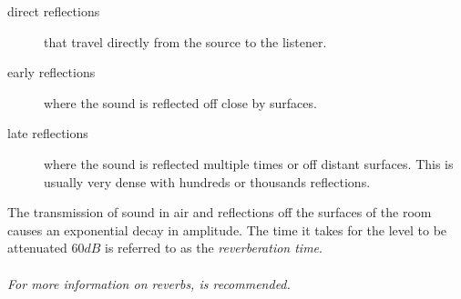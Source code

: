 \begin{description}
    \item[direct reflections] that travel directly from the source to the listener.
    \item[early reflections] where the sound is reflected off close by surfaces.
    \item[late reflections] where the sound is reflected multiple times or off distant surfaces. This is usually very dense with hundreds
        or thousands reflections.
\end{description}

The transmission of sound in air and reflections off the surfaces of the room causes an exponential decay in amplitude. The time it takes for the level to be attenuated $60dB$ is referred to as the \textit{reverberation time}.
\\~\\
\textit{For more information on reverbs, \cite{Gardner:2002} is recommended.}
